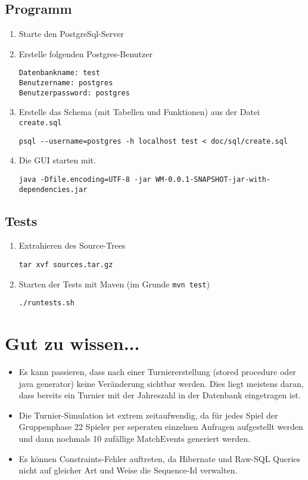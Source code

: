 \documentclass[11pt,german]{scrartcl}
\begin{document}
\subsection*{Programm}
\begin{enumerate}
\item Starte den PostgreSql-Server
\item Erstelle folgenden Postgres-Benutzer
\begin{verbatim}Datenbankname: test
Benutzername: postgres
Benutzerpassword: postgres\end{verbatim}

\item Erstelle das Schema (mit Tabellen und Funktionen) aus der Datei {\tt create.sql}
\begin{lstlisting}
psql --username=postgres -h localhost test < doc/sql/create.sql
\end{lstlisting}

\item Die GUI starten mit.
\begin{lstlisting}
java -Dfile.encoding=UTF-8 -jar WM-0.0.1-SNAPSHOT-jar-with-dependencies.jar
\end{lstlisting}
\end{enumerate}



\subsection*{Tests}

\begin{enumerate}
\item Extrahieren des Source-Trees
\begin{lstlisting}
tar xvf sources.tar.gz
\end{lstlisting}
\item Starten der Tests mit Maven (im Grunde {\tt mvn test})
\begin{lstlisting}
./runtests.sh
\end{lstlisting}
\end{enumerate}


\section*{Gut zu wissen...}
\begin{itemize}
\item Es kann passieren, dass nach einer Turniererstellung (stored procedure oder java generator) keine Veränderung sichtbar werden.
Dies liegt meistens daran, dass bereits ein Turnier mit der Jahreszahl in der Datenbank eingetragen ist.

\item Die Turnier-Simulation ist extrem zeitaufwendig, da für jedes Spiel der Gruppenphase 22 Spieler per seperaten einzelnen Anfragen aufgestellt werden und dann nochmals 10 zufällige MatchEvents generiert werden.

\item Es können Constraints-Fehler auftreten, da Hibernate und Raw-SQL Queries nicht auf gleicher Art und Weise die Sequence-Id verwalten.
\end{itemize}
\end{document}
